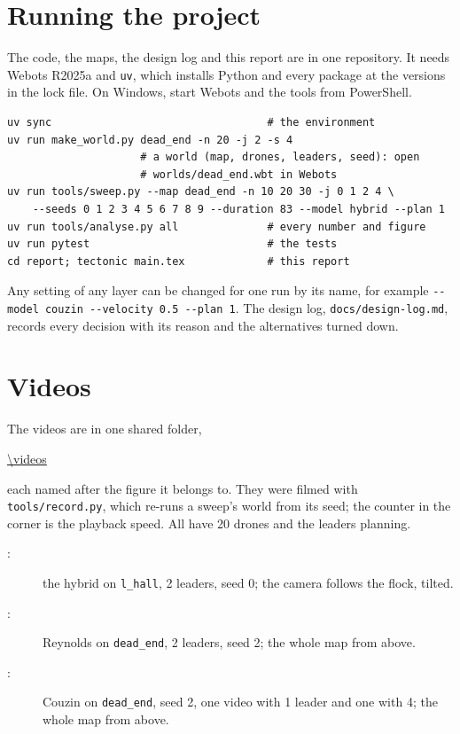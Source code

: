 \section{Running the project}
\label{app:running}

The code, the maps, the design log and this report are in one repository.
It needs Webots R2025a and \texttt{uv}, which installs Python and every
package at the versions in the lock file. On Windows, start Webots and the
tools from PowerShell.

{\small
\begin{verbatim}
uv sync                                  # the environment
uv run make_world.py dead_end -n 20 -j 2 -s 4
                     # a world (map, drones, leaders, seed): open
                     # worlds/dead_end.wbt in Webots
uv run tools/sweep.py --map dead_end -n 10 20 30 -j 0 1 2 4 \
    --seeds 0 1 2 3 4 5 6 7 8 9 --duration 83 --model hybrid --plan 1
uv run tools/analyse.py all              # every number and figure
uv run pytest                            # the tests
cd report; tectonic main.tex             # this report
\end{verbatim}}

Any setting of any layer can be changed for one run by its name, for example
\texttt{-{}-model couzin -{}-velocity 0.5 -{}-plan 1}. The design log,
\texttt{docs/design-log.md}, records every decision with its reason and the
alternatives turned down.

\section{Videos}
\label{app:videos}

The videos are in one shared folder,
\begin{center}
  \small\expandafter\url\expandafter{\videos}
\end{center}
each named after the figure it belongs to. They were filmed with
\texttt{tools/record.py}, which re-runs a sweep's world from its seed; the
counter in the corner is the playback speed. All have 20 drones and the
leaders planning.
\begin{description}
  \item[:] the hybrid on \texttt{l\_hall}, 2 leaders,
    seed 0; the camera follows the flock, tilted.
  \item[:] Reynolds on \texttt{dead\_end}, 2
    leaders, seed 2; the whole map from above.
  \item[:] Couzin on \texttt{dead\_end}, seed 2, one
    video with 1 leader and one with 4; the whole map from above.
\end{description}

